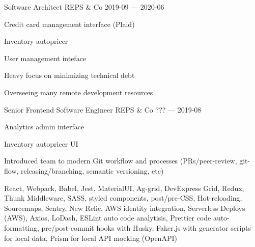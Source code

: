 


\begin{cventries}

  \cventry
    {Software Architect} %
    {REPS \& Co} %
    {} %
    {2019-09 — 2020-06} %
    {
      \begin{cvitems} %
        \item {Credit card management interface (Plaid)}
        \item {Inventory autopricer}
        \item {User management inteface}
        \item {Heavy focus on minimizing technical debt}
        \item {Overseeing many remote development resources}
      \end{cvitems}
    }


  \cventry
    {Senior Frontend Software Engineer} %
    {REPS \& Co} %
    {} %
    {??? — 2019-08} %
    {
      \begin{cvitems} %
        \item {Analytics admin interface}
        \item {Inventory autopricer UI}
        \item {Introduced team to modern Git workflow and processes (PRs/peer-review, git-flow, releasing/branching, semantic versioning, etc)}
        \item {React, Webpack, Babel, Jest, MaterialUI, Ag-grid, DevExpress Grid, Redux, Thunk Middleware, SASS, styled components, post/pre-CSS, Hot-reloading, Sourcemaps, Sentry, New Relic, AWS identity integration, Serverless Deploys (AWS), Axios, LoDash, ESLint auto code analytisis, Prettier code auto-formatting, pre/post-commit hooks with Husky, Faker.js with generator scripts for local data, Prism for local API mocking (OpenAPI)}
      \end{cvitems}
    }



\end{cventries}
